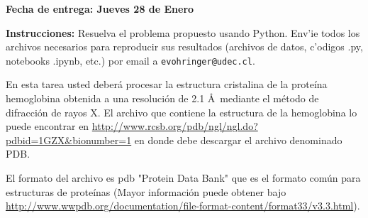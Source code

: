\documentclass[11pt]{exam}
\begin{document}
\firstpageheadrule
\runningheadrule
{}
\cfoot{ }
\begin{flushleft}
\vspace{0.2in}
\vspace{0.25cm}
\end{flushleft}

\begin{center}
\textbf{Fecha de entrega: Jueves 28 de Enero}
\end{center}
\textbf{Instrucciones:} Resuelva el problema propuesto usando Python. Env'ie todos los archivos necesarios para reproducir sus resultados (archivos de datos, c'odigos .py, notebooks .ipynb, etc.) por email a \texttt{evohringer@udec.cl}.

\bigskip

En esta tarea usted deber\'a procesar la estructura cristalina de la prote\'ina hemoglobina obtenida a una resoluci\'on de 2.1 \AA\ mediante el m\'etodo de difracci\'on de rayos X. El archivo que contiene la estructura de la hemoglobina lo puede encontrar en \url{http://www.rcsb.org/pdb/ngl/ngl.do?pdbid=1GZX&bionumber=1} en donde debe descargar el archivo denominado PDB.

El formato del archivo es pdb "Protein Data Bank" que es el formato com\'un para estructuras de prote\'inas (Mayor informaci\'on puede obtener bajo \url{http://www.wwpdb.org/documentation/file-format-content/format33/v3.3.html}). 
\end{document}
